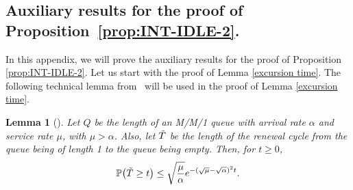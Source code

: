 \documentclass[11pt, reqno]{article}
\DeclarePairedDelimiter\autobracket{(}{)}
\newcommand{\br}[1]{\autobracket*{#1}}
\newtheorem{lemma}[theorem]{Lemma}
\numberwithin{equation}{section}
\numberwithin{theorem}{section}
\begin{document}
\begin{appendix}
\section{Auxiliary results for the proof of Proposition~\ref{prop:INT-IDLE-2}.}
\label{appendix:prop3.2}
In this appendix, we will prove the auxiliary results for the proof of Proposition \ref{prop:INT-IDLE-2}. 
Let us start with the proof of Lemma \ref{excursion time}.
The following technical lemma from~\cite{GW19} will be used in the proof of Lemma \ref{excursion time}.
\begin{lemma}[{\cite[Lemma EC.18]{GW19}}]\label{lemma:ec18}
Let $Q$ be the length of an M/M/1 queue with arrival rate $\alpha$ and service rate $\mu$, with $\mu>\alpha$. Also, let $\Tilde{T}$ be the length of the renewal cycle from the queue being of length 1 to the queue being empty. Then, for $t\geq0$,
$$\mathbb{P}\br{\Tilde{T}\geq t}\leq \sqrt{\frac{\mu}{\alpha}}e^{-(\sqrt{\mu}-\sqrt{\alpha})^2t}.$$
\end{lemma}


\end{appendix}
\end{document}
